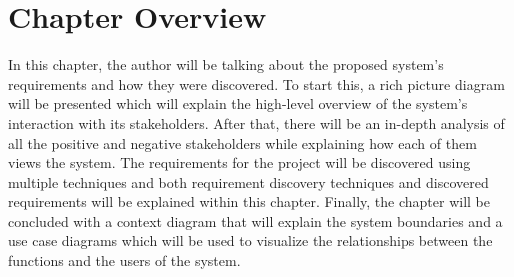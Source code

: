 \section{Chapter Overview}

In this chapter, the author will be talking about the proposed system's requirements and how they were discovered. To start this, a rich picture diagram will be presented which will explain the high-level overview of the system's interaction with its stakeholders. After that, there will be an in-depth analysis of all the positive and negative stakeholders while explaining how each of them views the system. The requirements for the project will be discovered using multiple techniques and both requirement discovery techniques and discovered requirements will be explained within this chapter. Finally, the chapter will be concluded with a context diagram that will explain the system boundaries and a use case diagrams which will be used to visualize the relationships between the functions and the users of the system. 